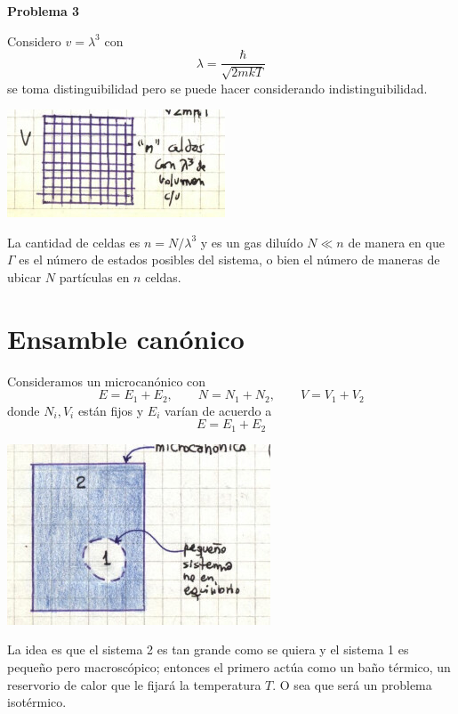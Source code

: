 \documentclass[10pt,oneside]{CBFT_book}
\begin{document}
\begin{ejemplo}{\bf Problema 3}

Considero $v = \lambda^3 $ con 
\[
	\lambda = \frac{\hbar}{\sqrt{2 m k T}}
\]
se toma distinguibilidad pero se puede hacer considerando indistinguibilidad.
 
\includegraphics[scale=0.5]{images/1606329374.jpg} 

La cantidad de celdas es $n = N / \lambda^3$ y es un gas diluído $ N \ll n $ de manera en que
$\Gamma$ es el número de estados posibles del sistema, o bien el número de maneras de ubicar
$N$ partículas en $n$ celdas.
 
\end{ejemplo}



\section{Ensamble canónico}

Consideramos un microcanónico con 
\[
	E = E_1 + E_2, \qquad N = N_1 + N_2, \qquad V = V_1 + V_2 
\]
donde $N_i, V_i$ están fijos y $E_i$ varían de acuerdo a
\[
	E = E_1 + E_2
\]

\includegraphics[scale=0.5]{images/1606329302.jpg}

La idea es que el sistema 2 es tan grande como se quiera y el sistema 1 es pequeño pero macroscópico;
entonces el primero actúa como un baño térmico, un reservorio de calor que le fijará la temperatura $T$.
O sea que será un problema isotérmico.
\end{document}
